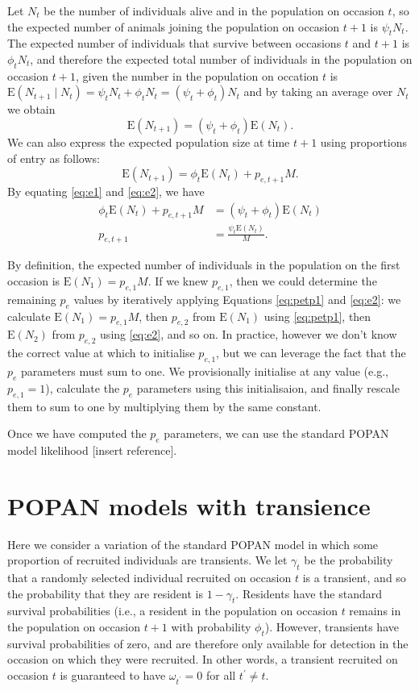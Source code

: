 \documentclass{article}
\newcommand{\E}[1]{\mathrm{E}(#1)}
\begin{document}
Let $N_t$ be the number of individuals alive and in the population on
occasion $t$, so the expected number of animals joining the population
on occasion $t + 1$ is $\psi_t N_t$. The expected number of
individuals that survive between occasions $t$ and $t + 1$ is $\phi_t
N_t$, and therefore the expected total number of individuals in the
population on occasion $t + 1$, given the number in the population on
occation $t$ is $\E{N_{t + 1} \mid N_t} = \psi_t N_t + \phi_t N_t =
(\psi_t + \phi_t)N_t$ and by taking an average over $N_t$ we obtain
\begin{equation}
  \E{N_{t + 1}} = (\psi_t + \phi_t) \E{N_t}. \label{eq:e1}
\end{equation}
We can also express the expected population size at time $t + 1$ using
proportions of entry as follows:
\begin{equation}
  \E{N_{t + 1}} = \phi_t \E{N_t} + p_{e, t + 1} M. \label{eq:e2}
\end{equation}
By equating \eqref{eq:e1} and \eqref{eq:e2}, we have
\begin{align}
  \phi_t \E{N_t} + p_{e, t + 1} M &= (\psi_t + \phi_t) \E{N_t} \nonumber \\
  p_{e, t + 1} &= \frac{\psi_t \E{N_t}}{M}. \label{eq:petp1}
\end{align}

By definition, the expected number of individuals in the population on
the first occasion is $\E{N_1} = p_{e, 1} M$. If we knew $p_{e, 1}$,
then we could determine the remaining $p_e$ values by iteratively
applying Equations \eqref{eq:petp1} and \eqref{eq:e2}: we calculate
$\E{N_1} = p_{e, 1} M$, then $p_{e, 2}$ from $\E{N_1}$ using
\eqref{eq:petp1}, then $\E{N_2}$ from $p_{e, 2}$ using \eqref{eq:e2},
and so on. In practice, however we don't know the correct value at
which to initialise $p_{e, 1}$, but we can leverage the fact that the
$p_e$ parameters must sum to one. We provisionally initialise at any
value (e.g., $p_{e, 1} = 1$), calculate the $p_e$ parameters using
this initialisaion, and finally rescale them to sum to one by
multiplying them by the same constant.

Once we have computed the $p_e$ parameters, we can use the standard
POPAN model likelihood [insert reference].

\section{POPAN models with transience}

Here we consider a variation of the standard POPAN model in which some
proportion of recruited individuals are transients. We let $\gamma_t$
be the probability that a randomly selected individual recruited on
occasion $t$ is a transient, and so the probability that they are
resident is $1 - \gamma_t$. Residents have the standard survival
probabilities (i.e., a resident in the population on occasion $t$
remains in the population on occasion $t + 1$ with probability
$\phi_t$). However, transients have survival probabilities of zero,
and are therefore only available for detection in the occasion on
which they were recruited. In other words, a transient recruited on
occasion $t$ is guaranteed to have $\omega_{t^{\prime}} = 0$ for all
$t^\prime \ne t$.
\end{document}
